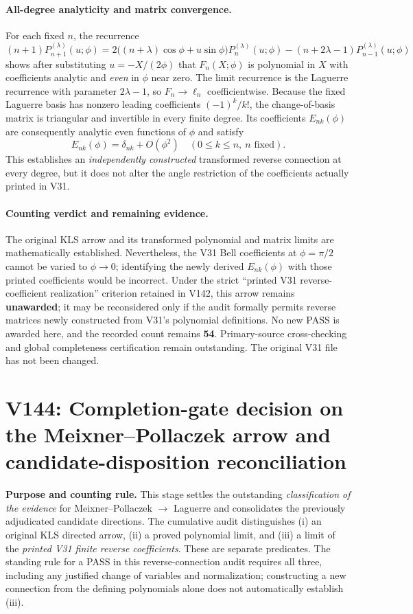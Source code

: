 \documentclass[11pt]{article}
\begin{document}
\paragraph{All-degree analyticity and matrix convergence.}
For each fixed $n$, the recurrence
\[
 (n+1)P_{n+1}^{(\lambda)}(u;\phi)
 =2\bigl((n+\lambda)\cos\phi+u\sin\phi\bigr)P_n^{(\lambda)}(u;\phi)
 -(n+2\lambda-1)P_{n-1}^{(\lambda)}(u;\phi)
\]
shows after substituting $u=-X/(2\phi)$ that $F_n(X;\phi)$ is polynomial in $X$ with coefficients analytic and \emph{even} in $\phi$ near zero. The limit recurrence is the Laguerre recurrence with parameter $2\lambda-1$, so $F_n\to\ell_n$ coefficientwise. Because the fixed Laguerre basis has nonzero leading coefficients $(-1)^k/k!$, the change-of-basis matrix is triangular and invertible in every finite degree. Its coefficients $E_{nk}(\phi)$ are consequently analytic even functions of $\phi$ and satisfy
\[
 \boxed{E_{nk}(\phi)=\delta_{nk}+O(\phi^2)\quad(0\le k\le n,\ n\text{ fixed}).}
\]
This establishes an \emph{independently constructed} transformed reverse connection at every degree, but it does not alter the angle restriction of the coefficients actually printed in V31.

\paragraph{Counting verdict and remaining evidence.}
The original KLS arrow and its transformed polynomial and matrix limits are mathematically established. Nevertheless, the V31 Bell coefficients at $\phi=\pi/2$ cannot be varied to $\phi\to0$; identifying the newly derived $E_{nk}(\phi)$ with those printed coefficients would be incorrect. Under the strict ``printed V31 reverse-coefficient realization'' criterion retained in V142, this arrow remains \textbf{unawarded}; it may be reconsidered only if the audit formally permits reverse matrices newly constructed from V31's polynomial definitions. No new PASS is awarded here, and the recorded count remains \textbf{54}. Primary-source cross-checking and global completeness certification remain outstanding. The original V31 file has not been changed.



\clearpage
\section{V144: Completion-gate decision on the Meixner--Pollaczek arrow and candidate-disposition reconciliation}
\noindent\textbf{Purpose and counting rule.} This stage settles the outstanding \emph{classification of the evidence} for Meixner--Pollaczek $\to$ Laguerre and consolidates the previously adjudicated candidate directions. The cumulative audit distinguishes (i) an original KLS directed arrow, (ii) a proved polynomial limit, and (iii) a limit of the \emph{printed V31 finite reverse coefficients}. These are separate predicates. The standing rule for a PASS in this reverse-connection audit requires all three, including any justified change of variables and normalization; constructing a new connection from the defining polynomials alone does not automatically establish (iii).
\end{document}
